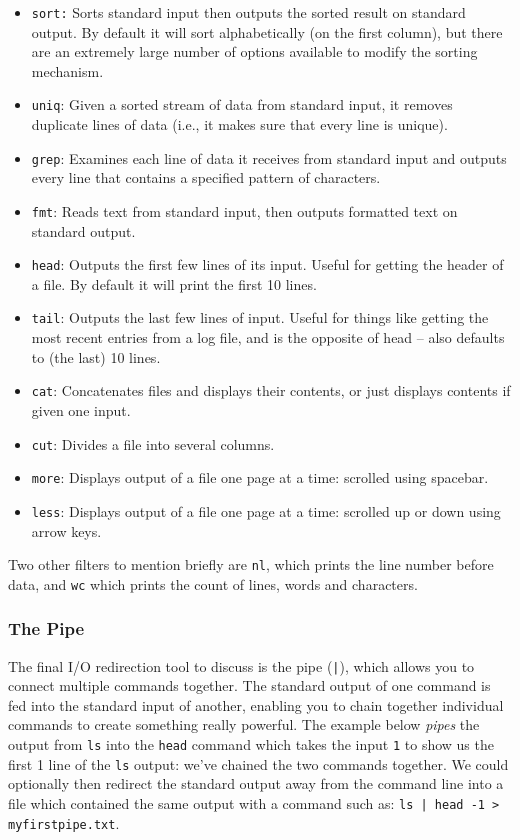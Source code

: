 \documentclass[11pt]{article}
\begin{document}
\begin{itemize} 
\item \texttt{sort:} Sorts standard input then outputs the sorted result on standard output. By default it will sort alphabetically (on the first column), but there are an extremely large number of options available to modify the sorting mechanism.
\item \texttt{uniq}: Given a sorted stream of data from standard input, it removes duplicate lines of data (i.e., it makes sure that every line is unique).
\item \texttt{grep}: Examines each line of data it receives from standard input and outputs every line that contains a specified pattern of characters.
\item \texttt{fmt}: Reads text from standard input, then outputs formatted text on standard output.
\item \texttt{head}: Outputs the first few lines of its input. Useful for getting the header of a file. By default it will print the first 10 lines.
\item \texttt{tail}: Outputs the last few lines of input. Useful for things like getting the most recent entries from a log file, and is the opposite of head -- also defaults to (the last) 10 lines.
\item \texttt{cat}: Concatenates files and displays their contents, or just displays contents if given one input.
\item \texttt{cut}: Divides a file into several columns.
\item \texttt{more}: Displays output of a file one page at a time: scrolled using spacebar.
\item \texttt{less}: Displays output of a file one page at a time: scrolled up or down using arrow keys.
\end{itemize}

Two other filters to mention briefly are \texttt{nl}, which prints the line number before data, and \texttt{wc} which prints the count of lines, words and characters.

\subsubsection{The Pipe}

The final I/O redirection tool to discuss is the pipe (\texttt{|}), which allows you to connect multiple commands together. The standard output of one command is fed into the standard input of another, enabling you to chain together individual commands to create something really powerful. The example below \emph{pipes} the output from \texttt{ls} into the \texttt{head} command which takes the input \texttt{1} to show us the first 1 line of the \texttt{ls} output: we've chained the two commands together. We could optionally then redirect the standard output away from the command line into a file which contained the same output with a command such as: \texttt{ls | head -1 > myfirstpipe.txt}.\\
\end{document}
